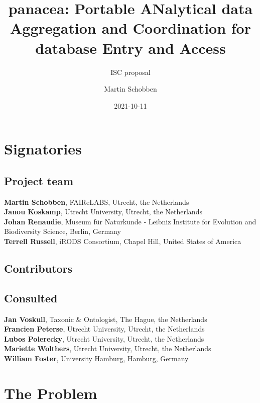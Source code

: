 \documentclass[]{article}
\title{panacea: Portable ANalytical data Aggregation and Coordination for database Entry and Access}
\subtitle{ISC proposal}
\author{Martin Schobben}
\date{2021-10-11}
\begin{document}
\maketitle

{
\setcounter{tocdepth}{2}
\tableofcontents
}
\hypertarget{signatories}{%
\section{Signatories}\label{signatories}}

\hypertarget{project-team}{%
\subsection{Project team}\label{project-team}}

\textbf{Martin Schobben}, FAIReLABS, Utrecht, the Netherlands\\
\textbf{Janou Koskamp}, Utrecht University, Utrecht, the Netherlands\\
\textbf{Johan Renaudie}, Museum für Naturkunde ‐ Leibniz Institute for Evolution and Biodiversity Science, Berlin, Germany\\
\textbf{Terrell Russell}, iRODS Consortium, Chapel Hill, United States of America

\hypertarget{contributors}{%
\subsection{Contributors}\label{contributors}}

\hypertarget{consulted}{%
\subsection{Consulted}\label{consulted}}

\textbf{Jan Voskuil}, Taxonic \& Ontologist, The Hague, the Netherlands\\
\textbf{Francien Peterse}, Utrecht University, Utrecht, the Netherlands\\
\textbf{Lubos Polerecky}, Utrecht University, Utrecht, the Netherlands\\
\textbf{Mariette Wolthers}, Utrecht University, Utrecht, the Netherlands\\
\textbf{William Foster}, University Hamburg, Hamburg, Germany

\hypertarget{the-problem}{%
\section{The Problem}\label{the-problem}}
\end{document}
